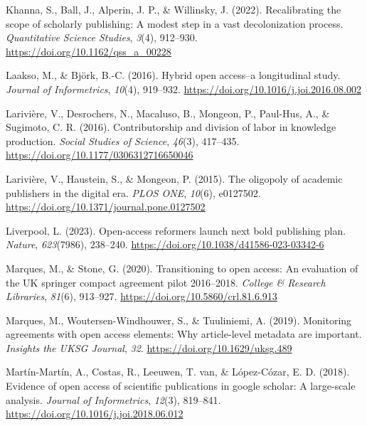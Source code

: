 \documentclass[a4paper,man,floatsintext,longtable,noextraspace,12pt]{apa6}
\newenvironment{CSLReferences}%
  {}%
  {\par}
\begin{document}
\begin{CSLReferences}{1}{0}
\leavevmode{}%
Khanna, S., Ball, J., Alperin, J. P., \& Willinsky, J. (2022).
Recalibrating the scope of scholarly publishing: A modest step in a vast
decolonization process. \emph{Quantitative Science Studies},
\emph{3}(4), 912--930. \url{https://doi.org/10.1162/qss_a_00228}

\leavevmode{}%
Laakso, M., \& Björk, B.-C. (2016). Hybrid open access--a longitudinal
study. \emph{Journal of Informetrics}, \emph{10}(4), 919--932.
\url{https://doi.org/10.1016/j.joi.2016.08.002}

\leavevmode{}%
Larivière, V., Desrochers, N., Macaluso, B., Mongeon, P., Paul-Hus, A.,
\& Sugimoto, C. R. (2016). Contributorship and division of labor in
knowledge production. \emph{Social Studies of Science}, \emph{46}(3),
417--435. \url{https://doi.org/10.1177/0306312716650046}

\leavevmode{}%
Larivière, V., Haustein, S., \& Mongeon, P. (2015). The oligopoly of
academic publishers in the digital era. \emph{{PLOS} {ONE}},
\emph{10}(6), e0127502.
\url{https://doi.org/10.1371/journal.pone.0127502}

\leavevmode{}%
Liverpool, L. (2023). Open-access reformers launch next bold publishing
plan. \emph{Nature}, \emph{623}(7986), 238--240.
\url{https://doi.org/10.1038/d41586-023-03342-6}

\leavevmode{}%
Marques, M., \& Stone, G. (2020). Transitioning to open access: An
evaluation of the {UK} springer compact agreement pilot 2016--2018.
\emph{College {\&} Research Libraries}, \emph{81}(6), 913--927.
\url{https://doi.org/10.5860/crl.81.6.913}

\leavevmode{}%
Marques, M., Woutersen-Windhouwer, S., \& Tuuliniemi, A. (2019).
Monitoring agreements with open access elements: Why article-level
metadata are important. \emph{Insights the {UKSG} Journal}, \emph{32}.
\url{https://doi.org/10.1629/uksg.489}

\leavevmode{}%
Martín-Martín, A., Costas, R., Leeuwen, T. van, \& López-Cózar, E. D.
(2018). Evidence of open access of scientific publications in google
scholar: A large-scale analysis. \emph{Journal of Informetrics},
\emph{12}(3), 819--841. \url{https://doi.org/10.1016/j.joi.2018.06.012}


\end{CSLReferences}
\end{document}
